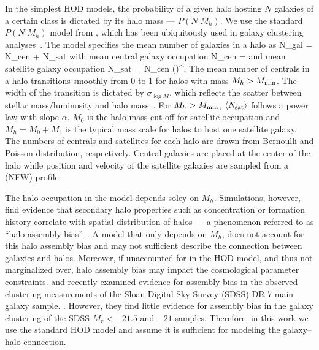 In the simplest HOD models, the probability of a given halo hosting $N$ galaxies 
of a certain class is dictated by its halo mass --- $P(N|M_h)$.%
We use the standard $P(N|M_h)$ model from \cite{zheng2007}, which has been 
ubiquitously used in galaxy clustering analyses~\citep[\emph{e.g.}][]{sinha2018}. 
The model specifies the mean number of galaxies in a halo as
\beq
\langle N_{\rm gal} \rangle = \langle N_{\rm cen} \rangle + \langle N_{\rm sat} \rangle
\eeq
with mean central galaxy occupation
\beq \label{eq:Ncen}
\langle N_{\rm cen} \rangle  = 
\eeq
and mean satellite galaxy occupation
\beq \label{eq:Nsat}
\langle N_{\rm sat} \rangle = \langle N_{\rm cen} \rangle \bigg(\bigg)^\alpha.
\eeq
The mean number of centrals in a halo transitions smoothly from 0 to 1 for halos 
with mass $M_h > M_{\rm min}$. The width of the transition is dictated by 
$\sigma_{\log M}$, which reflects the scatter between stellar mass/luminosity and 
halo mass~\citep{citecite}. For $M_h > M_{\rm min}$, 
$\langle N_{\rm sat} \rangle$ follows a power law with slope $\alpha$. $M_0$ 
is the halo mass cut-off for satellite occupation and $M_h = M_0 + M_1$ is 
the typical mass scale for halos to host one satellite galaxy. The numbers 
of centrals and satellites for each halo are drawn from Bernoulli and Poisson 
distribution, respectively. Central galaxies are placed at the center of the
halo while position and velocity of the satellite galaxies are sampled from a 
\cite{navarro1997} (NFW) profile. 

The halo occupation in the \cite{zheng2007} model depends soley on $M_h$. 
Simulations, however, find evidence that secondary halo properties such as
concentration or formation history correlate with spatial distribution of
halos --- a phenomenon referred to as ``halo assembly bias''~\citep{sheth2004, gao2005, harker2006, wechsler2006}.
A model that only depends on $M_h$, does not account for this halo assembly 
bias and may not sufficient describe the connection between galaxies and 
halos. Moreover, if unaccounted for in the HOD model, and thus not marginalized 
over, halo assembly bias may impact the cosmological parameter constraints. 
\cite{zentner2016} and \cite{vakili2019} recently examined evidence for 
assembly bias in the observed clustering measurements of the Sloan Digital 
Sky Survey (SDSS) DR 7 main galaxy sample. 
. 
However, they find little evidence for assembly bias in the galaxy clustering
of the SDSS $M_r < -21.5$  and $-21$ samples. Therefore, in this work we use 
the standard \cite{zheng2007} HOD model and assume it is sufficient for modeling 
the galaxy--halo connection. 

